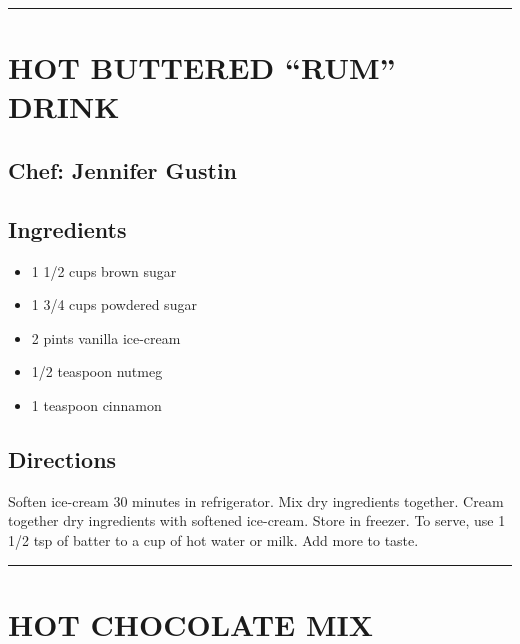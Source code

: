 \documentclass[
]{book}
\providecommand{\tightlist}{%
  \setlength{\itemsep}{0pt}\setlength{\parskip}{0pt}}
\begin{document}
\begin{center}\rule{0.5\linewidth}{0.5pt}\end{center}

\hypertarget{hot-buttered-rum-drink}{%
\section*{HOT BUTTERED ``RUM'' DRINK}\label{hot-buttered-rum-drink}}

\hypertarget{chef-jennifer-gustin-1}{%
\subsection*{Chef: Jennifer Gustin}\label{chef-jennifer-gustin-1}}

\hypertarget{ingredients-6}{%
\subsection*{Ingredients}\label{ingredients-6}}

\begin{itemize}
\tightlist
\item
  1 1/2 cups brown sugar
\item
  1 3/4 cups powdered sugar
\item
  2 pints vanilla ice-cream
\item
  1/2 teaspoon nutmeg
\item
  1 teaspoon cinnamon
\end{itemize}

\hypertarget{directions-6}{%
\subsection*{Directions}\label{directions-6}}

Soften ice-cream 30 minutes in refrigerator. Mix dry ingredients together.
Cream together dry ingredients with softened ice-cream.
Store in freezer. To serve, use 1 1/2 tsp of batter to a cup of hot water or milk. Add more to taste.

\begin{center}\rule{0.5\linewidth}{0.5pt}\end{center}

\hypertarget{hot-chocolate-mix}{%
\section*{HOT CHOCOLATE MIX}\label{hot-chocolate-mix}}
\end{document}
